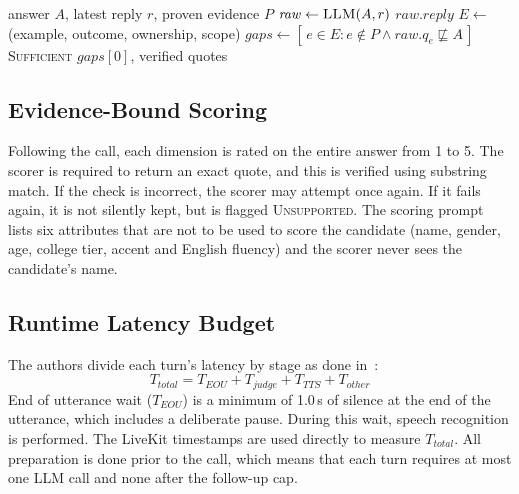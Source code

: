 \documentclass[conference]{IEEEtran}
\begin{document}
\begin{algorithm}[t]
\caption{Evidence-verified judge}
\label{alg:judge}
\small
\begin{algorithmic}
\Require answer $A$, latest reply $r$, proven evidence $P$
\State $\mathit{raw} \gets \textsc{LLM}(A, r)$ 
 \Return $\mathit{raw}.\mathit{reply}$ \EndIf
\State $E \gets$ (example, outcome, ownership, scope) 
\State $\mathit{gaps} \gets [\,e \in E : e \notin P \wedge \mathit{raw}.q_e \not\sqsubseteq A\,]$
 \Return \textsc{Sufficient} \EndIf
\State \Return $\mathit{gaps}[0]$, verified quotes
\end{algorithmic}
\end{algorithm}

\subsection{Evidence-Bound Scoring}

Following the call, each dimension is rated on the entire answer from 1 to 5. The scorer is required to return an exact quote, and this is verified using substring match. If the check is incorrect, the scorer may attempt once again. If it fails again, it is not silently kept, but is flagged \textsc{Unsupported}. The scoring prompt lists six attributes that are not to be used to score the candidate (name, gender, age, college tier, accent and English fluency) and the scorer never sees the candidate's name.

\subsection{Runtime Latency Budget}

The authors divide each turn's latency by stage as done in~\cite{freezeomni}:
\begin{equation}
T_{\mathit{total}} = T_{\mathit{EOU}} + T_{\mathit{judge}} + T_{\mathit{TTS}} + T_{\mathit{other}}
\end{equation}
End of utterance wait ($T_{\mathit{EOU}}$) is a minimum of 1.0\,s of silence at the end of the utterance, which includes a deliberate pause. During this wait, speech recognition is performed. The LiveKit timestamps are used directly to measure $T_{\mathit{total}}$. All preparation is done prior to the call, which means that each turn requires at most one LLM call and none after the follow-up cap.
\end{document}
